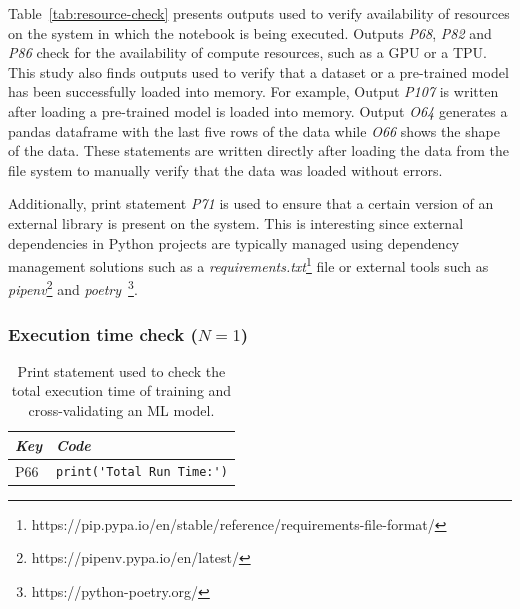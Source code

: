 Table~\ref{tab:resource-check} presents outputs used to verify availability of resources on the system in which the notebook is being executed. Outputs \emph{P68}, \emph{P82} and \emph{P86} check for the availability of compute resources, such as a GPU or a TPU. This study also finds outputs used to verify that a dataset or a pre-trained model has been successfully loaded into memory. For example, Output \emph{P107} is written after loading a pre-trained model is loaded into memory. Output \emph{O64} generates a pandas dataframe with the last five rows of the data while \emph{O66} shows the shape of the data. These statements are written directly after loading the data from the file system to manually verify that the data was loaded without errors.

Additionally, print statement \emph{P71} is used to ensure that a certain version of an external library is present on the system. This is interesting since external dependencies in Python projects are typically managed using dependency management solutions such as a \emph{requirements.txt}\footnote{https://pip.pypa.io/en/stable/reference/requirements-file-format/} file or external tools such as \emph{pipenv}\footnote{https://pipenv.pypa.io/en/latest/} and \emph{poetry}~\footnote{https://python-poetry.org/}.


\subsubsection{Execution time check ($N = 1$)}

\begin{table}
  \centering
  \caption{Print statement used to check the total execution time of training and cross-validating an ML model.}
  \begin{tabular}{@{}m{} m{}@{}}
    \toprule
    \emph{\textbf{Key}}&
    \emph{\textbf{Code}}\\
    \midrule

    P66&
    \lstinline[]$print('Total Run Time:')$\\
    \bottomrule
  \end{tabular}
  \label{tab:exec-time}
\end{table}

